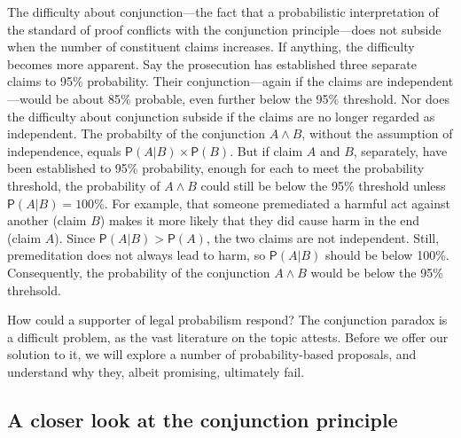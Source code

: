 \documentclass[10pt,dvipsnames,enabledeprecatedfontcommands]{scrartcl}
\newcommand{\et}{\wedge}
\newcommand{\pr}[1]{\mathsf{P}(#1)}
\begin{document}
The difficulty about conjunction---the fact that a probabilistic
interpretation of the standard of proof conflicts with the conjunction
principle---does not subside when the number of constituent claims
increases. If anything, the difficulty becomes more apparent. Say the
prosecution has established three separate claims to 95\% probability.
Their conjunction---again if the claims are independent---would be about
85\% probable, even further below the 95\% threshold. Nor does the
difficulty about conjunction subside if the claims are no longer
regarded as independent. The probabilty of the conjunction \(A \et B\),
without the assumption of independence, equals
\(\pr{A | B} \times \pr{B}\). But if claim \(A\) and \(B\), separately,
have been established to 95\% probability, enough for each to meet the
probability threshold, the probability of \(A \et B\) could still be
below the 95\% threshold unless \(\pr{A | B}=100\%\). For example, that
someone premediated a harmful act against another (claim \(B\)) makes it
more likely that they did cause harm in the end (claim \(A\)). Since
\(\pr{A | B} > \pr{A}\), the two claims are not independent. Still,
premeditation does not always lead to harm, so \(\pr{A | B}\) should be
below 100\%. Consequently, the probability of the conjunction
\(A \et B\) would be below the 95\%
threhsold.

How could a supporter of legal probabilism respond? The conjunction
paradox is a difficult problem, as the vast literature on the topic
attests. Before we offer our solution to it, we will explore a number of
probability-based proposals, and understand why they, albeit promising,
ultimately fail.

\hypertarget{a-closer-look-at-the-conjunction-principle}{%
\subsection{A closer look at the conjunction
principle}\label{a-closer-look-at-the-conjunction-principle}}
\end{document}
